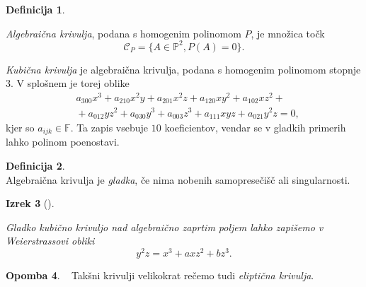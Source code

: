 \documentclass[12pt,a4paper,twoside]{article}
\theoremstyle{definition} %
\newtheorem{definicija}{Definicija}[section]
\newtheorem{opomba}[definicija]{Opomba}
\theoremstyle{plain} %
\newtheorem{izrek}[definicija]{Izrek}
\numberwithin{equation}{section}  %
\newcommand{\F}{\mathbb F}
\begin{document}
\begin{definicija}~

\emph{Algebraična krivulja}, podana s homogenim polinomom $P$, je množica točk 
$$\mathcal{C}_P= \{ A \in \mathbb{P}^2, P(A) = 0 \}.$$
\end{definicija}

\emph{Kubična krivulja} je algebraična krivulja, podana s homogenim polinomom stopnje 3. V splošnem je torej oblike
\begin{align}
&{} a_{300}x^3+a_{210}x^2y+a_{201}x^2z+a_{120}xy^2+a_{102}xz^2+ \nonumber \\
&{}+a_{012}yz^2+a_{030}y^3+a_{003}z^3+a_{111}xyz+a_{021}y^2z = 0, \nonumber
\end{align}
kjer so $a_{ijk} \in \F$.
Ta zapis vsebuje $10$ koeficientov, vendar se v gladkih primerih lahko polinom poenostavi.
\begin{definicija}~\\
Algebraična krivulja je \emph{gladka}, če nima nobenih samopresečišč ali singularnosti.
\end{definicija}

\begin{izrek}[]~

Gladko kubično krivuljo nad algebraično zaprtim poljem lahko zapišemo v Weierstrassovi obliki
$$y^2z = x^3 + axz^2 + bz^3.$$
\end{izrek}

\begin{opomba}~
Takšni krivulji velikokrat rečemo tudi \emph{eliptična krivulja}.
\end{opomba}
\end{document}
